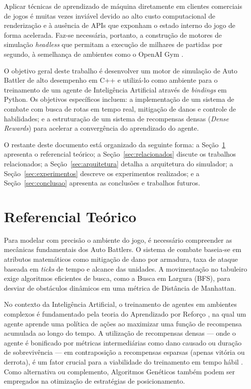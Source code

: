 \documentclass[12pt]{article}
\begin{document}
Aplicar técnicas de aprendizado de máquina diretamente em clientes comerciais de jogos é muitas vezes inviável devido ao alto custo computacional de renderização e à ausência de APIs que exponham o estado interno do jogo de forma acelerada. Faz-se necessária, portanto, a construção de motores de simulação \textit{headless} que permitam a execução de milhares de partidas por segundo, à semelhança de ambientes como o OpenAI Gym \cite{brockman2016}.

O objetivo geral deste trabalho é desenvolver um motor de simulação de Auto Battler de alto desempenho em C++ e utilizá-lo como ambiente para o treinamento de um agente de Inteligência Artificial através de \textit{bindings} em Python. Os objetivos específicos incluem: a implementação de um sistema de combate com busca de rotas em tempo real, mitigação de danos e controle de habilidades; e a estruturação de um sistema de recompensas densas (\textit{Dense Rewards}) para acelerar a convergência do aprendizado do agente.

O restante deste documento está organizado da seguinte forma: a Seção~\ref{sec:referencial} apresenta o referencial teórico; a Seção~\ref{sec:relacionados} discute os trabalhos relacionados; a Seção~\ref{sec:arquitetura} detalha a arquitetura do simulador; a Seção~\ref{sec:experimentos} descreve os experimentos realizados; e a Seção~\ref{sec:conclusao} apresenta as conclusões e trabalhos futuros.

\section{Referencial Teórico} \label{sec:referencial}

Para modelar com precisão o ambiente do jogo, é necessário compreender as mecânicas fundamentais dos Auto Battlers. O sistema de combate baseia-se em atributos matemáticos como mitigação de dano por armadura, taxa de ataque baseada em \textit{ticks} de tempo e alcance das unidades. A movimentação no tabuleiro exige algoritmos eficientes de busca, como a Busca em Largura (BFS), para desviar de obstáculos dinâmicos em uma métrica de Distância de Manhattan.

No contexto da Inteligência Artificial, o treinamento de agentes em ambientes complexos é fundamentado pela teoria do Aprendizado por Reforço \cite{sutton2018}, na qual um agente aprende uma política de ações ao maximizar uma função de recompensa acumulada ao longo do tempo. A utilização de recompensas densas — onde o agente é bonificado por métricas intermediárias como dano causado ou duração de sobrevivência — em contraposição a recompensas esparsas (apenas vitória ou derrota), é um fator crucial para a viabilidade do treinamento em tempo hábil \cite{mnih2015}. Como alternativa ou complemento, Algoritmos Genéticos \cite{goldberg1989, holland1975} também podem ser empregados na otimização de estratégias de posicionamento.
\end{document}
